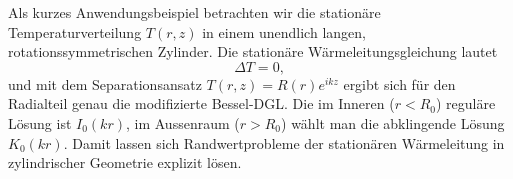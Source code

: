 Als kurzes Anwendungsbeispiel betrachten wir die stationäre Temperaturverteilung $T(r, z)$ in einem unendlich langen, rotationssymmetrischen Zylinder.
Die stationäre Wärmeleitungsgleichung lautet
\begin{equation}
\Delta T = 0,
\end{equation}
und mit dem Separationsansatz $T(r, z) = R(r) e^{ikz}$ ergibt sich für den Radialteil genau die modifizierte Bessel-DGL.
Die im Inneren ($r < R_0$) reguläre Lösung ist $I_0(kr)$, im Aussenraum ($r > R_0$) wählt man die abklingende Lösung $K_0(kr)$.
Damit lassen sich Randwertprobleme der stationären Wärmeleitung in zylindrischer Geometrie explizit lösen.

